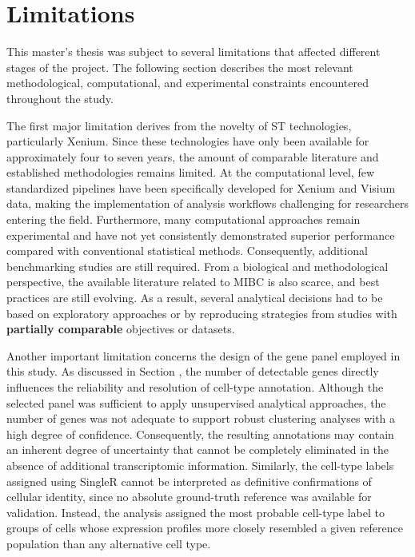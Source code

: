 \setchapterpreamble[u]{\margintoc}
\chapter{Limitations}

This master’s thesis was subject to several limitations that affected different stages of the project. The following section describes the most relevant methodological, computational, and experimental constraints encountered throughout the study.

The first major limitation derives from the novelty of ST technologies, particularly Xenium. Since these technologies have only been available for approximately four to seven years, the amount of comparable literature and established methodologies remains limited. At the computational level, few standardized pipelines have been specifically developed for Xenium and Visium data, making the implementation of analysis workflows challenging for researchers entering the field. Furthermore, many computational approaches remain experimental and have not yet consistently demonstrated superior performance compared with conventional statistical methods. Consequently, additional benchmarking studies are still required. From a biological and methodological perspective, the available literature related to MIBC is also scarce, and best practices are still evolving. As a result, several analytical decisions had to be based on exploratory approaches or by reproducing strategies from studies with \textbf{partially comparable} objectives or datasets.

Another important limitation concerns the design of the gene panel employed in this study. As discussed in Section , the number of detectable genes directly influences the reliability and resolution of cell-type annotation. Although the selected panel was sufficient to apply unsupervised analytical approaches, the number of genes was not adequate to support robust clustering analyses with a high degree of confidence. Consequently, the resulting annotations may contain an inherent degree of uncertainty that cannot be completely eliminated in the absence of additional transcriptomic information. Similarly, the cell-type labels assigned using SingleR cannot be interpreted as definitive confirmations of cellular identity, since no absolute ground-truth reference was available for validation. Instead, the analysis assigned the most probable cell-type label to groups of cells whose expression profiles more closely resembled a given reference population than any alternative cell type.

